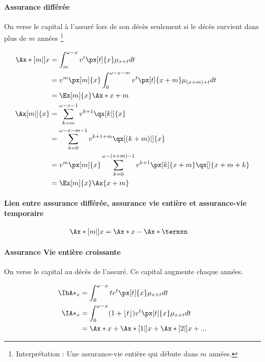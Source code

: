\documentclass[10pt, french]{article}
\begin{document}
\begin{multicols*}{3}
\paragraph{Assurance différée} On verse le capital à l'assuré lors de son décès seulement si le décès survient dans plus de $m$ années \footnote{Interprétation : Une assurance-vie entière qui débute dans $m$ années.}

\begin{align*}
\Ax*[m|]{x}	& = \int_{m}^{\omega -x} v^t \px[t]{x} \mu_{x+t} dt \\
	& = v^m \px[m]{x} \int_{0}^{\omega - x - m} v^t \px[t]{x+m} \mu_{(x+m)+t} dt \\
	& = \Ex[m]{x} \Ax*{x+m} \\
\Ax[m|]{x}	& = \sum_{k=m}^{\omega - x -1} v^{k+1} \qx[k|]{x} \\
	& = \sum_{k=0}^{\omega - x - m - 1} v^{k+1+m} \qx[(k+m)|]{x} \\
	& = v^m \px[m]{x} \sum_{k=0}^{\omega - (x+m) - 1} v^{k+1} \px[k]{x+m} \qx[]{x+m+k} \\
	& = \Ex[m]{x} \Ax{x+m} \\
\end{align*}
\paragraph{Lien entre assurance différée, assurance vie entière et assurance-vie temporaire}

\begin{align*}
\Ax*[m|]{x}	& = \Ax*{x} - \Ax*{\termxn}
\end{align*}

\paragraph{Assurance Vie entière croissante} On verse le capital au décès de l'assuré. Ce capital augmente chaque années.

\begin{align*}
	\IbA*_x &= \int_0^{\omega - x} t v^t \px[t]{x} \mu_{x+t} dt \\
	\IA*_{x} &= \int_0^{\omega - x} (1 + \lfloor t \rfloor) v^t \px[t]{x} \mu_{x+t} dt \\
		&= \Ax*{x} + \Ax*[1|]{x} + \Ax*[2|]{x} + ...
\end{align*}


\end{multicols*}
\end{document}
